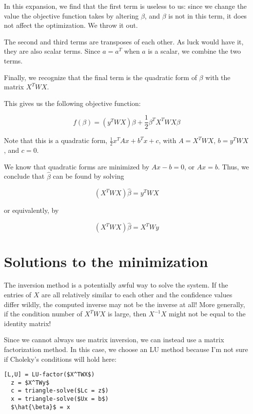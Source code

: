 \documentclass{article}
\begin{document}
In this expansion, we find that the first term is useless to us: since we change
the value the objective function takes by altering $\beta$, and $\beta$ is not
in this term, it does not affect the optimization. We throw it out.

The second and third terms are transposes of each other. As luck would have it,
they are also scalar terms. Since $a = a^T$ when $a$ is a scalar, we combine the
two terms.

Finally, we recognize that the final term is the quadratic form of $\beta$ with
the matrix $X^TWX$.

This gives us the following objective function:

\[
 f(\beta) = (y^T W X) \beta + \frac{1}{2} \beta^T X^T W X \beta
\]

Note that this is a quadratic form, $\frac{1}{2}x^TAx + b^Tx + c$, with $A =
X^TWX$, $b=y^TWX$, and $c=0$.

We know that quadratic forms are minimized by $Ax - b = 0$, or $Ax = b$. Thus,
we conclude that $\hat{\beta}$ can be found by solving

\[
  (X^TWX)\hat{\beta} = y^TWX
\]

or equivalently, by

\[
  (X^TWX)\hat{\beta} = X^TWy
\]

\section{Solutions to the minimization}

The inversion method is a potentially awful way to solve the system. If the
entries of $X$ are all relatively similar to each other and the confidence
values differ wildly, the computed inverse may not be the inverse at all! More
generally, if the condition number of $X^TWX$ is large, then $X^{-1}X$ might not
be equal to the identity matrix!


Since we cannot always use matrix inversion, we can instead use a matrix
factorization method. In this case, we choose an LU method because I'm not sure
if Choleky's conditions will hold here:

\begin{lstlisting}[mathescape = true]
  [L,U] = LU-factor($X^TWX$)
  z = $X^TWy$
  c = triangle-solve($Lc = z$)
  x = triangle-solve($Ux = b$)
  $\hat{\beta}$ = x
\end{lstlisting}
\end{document}
